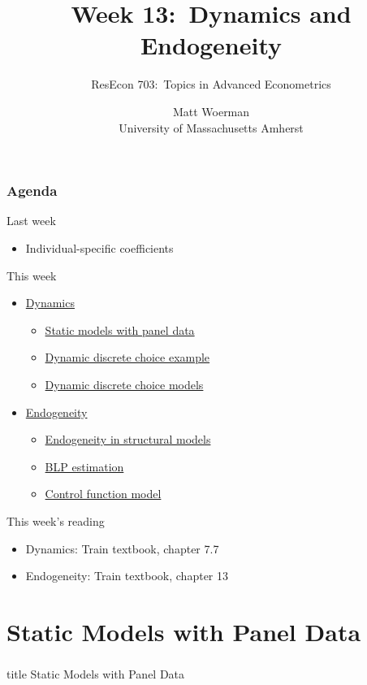 \documentclass{beamer}
\title[Week 13:\ Dynamics and Endogeneity]{Week 13:\ Dynamics and Endogeneity}
\author[ResEcon 703:\ Advanced Econometrics]{ResEcon 703:\ Topics in Advanced Econometrics}
\date{Matt Woerman\\University of Massachusetts Amherst}
\begin{document}
{ 
\begin{frame}[noframenumbering]
    \titlepage
\end{frame}
}

\begin{frame}\frametitle{Agenda}
    Last week
    \begin{itemize}
        \item Individual-specific coefficients
    \end{itemize}
    \vspace{2ex}
    This week
    \begin{itemize}
    	\item \hyperlink{page.\getpagerefnumber{panel}}{Dynamics}
    	\begin{itemize}
    		\item \hyperlink{page.\getpagerefnumber{panel}}{Static models with panel data}
    		\item \hyperlink{page.\getpagerefnumber{example}}{Dynamic discrete choice example}
    		\item \hyperlink{page.\getpagerefnumber{ddc}}{Dynamic discrete choice models}
    	\end{itemize}
    	\item \hyperlink{page.\getpagerefnumber{endog}}{Endogeneity}
    	\begin{itemize}
    		\item \hyperlink{page.\getpagerefnumber{endog}}{Endogeneity in structural models}
            \item \hyperlink{page.\getpagerefnumber{blp}}{BLP estimation}
            \item \hyperlink{page.\getpagerefnumber{cf}}{Control function model}
    	\end{itemize}
    \end{itemize}
    \vspace{2ex}
    This week's reading
    \begin{itemize}
    	\item Dynamics: Train textbook, chapter 7.7
    	\item Endogeneity: Train textbook, chapter 13
    \end{itemize}
\end{frame}

\section{Static Models with Panel Data}
\label{panel}
\begin{frame}\frametitle{}
    \vfill
    \centering
    \begin{beamercolorbox}[center]{title}
        \Large Static Models with Panel Data
    \end{beamercolorbox}
    \vfill
\end{frame}
\end{document}
